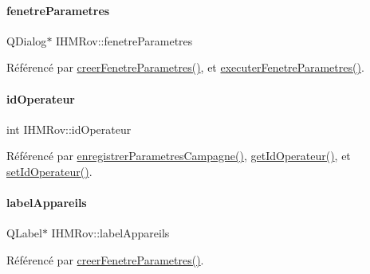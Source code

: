 \paragraph{\texorpdfstring{fenetre\+Parametres}{fenetreParametres}}
{\footnotesize\ttfamily Q\+Dialog$\ast$ I\+H\+M\+Rov\+::fenetre\+Parametres\hspace{0.3cm}{\ttfamily [private]}}



Référencé par \hyperlink{class_i_h_m_rov_aed451139ac09ef18b7c92637761d80ce}{creer\+Fenetre\+Parametres()}, et \hyperlink{class_i_h_m_rov_a2ec97de9b75c073c6a4dd0792a284002}{executer\+Fenetre\+Parametres()}.

\mbox{\label{class_i_h_m_rov_a110af5c174e9fbba12bffbe0301ed690}} 
\paragraph{\texorpdfstring{id\+Operateur}{idOperateur}}
{\footnotesize\ttfamily int I\+H\+M\+Rov\+::id\+Operateur\hspace{0.3cm}{\ttfamily [private]}}



Référencé par \hyperlink{class_i_h_m_rov_a229194814bfb1fc94ab3cc86d6411921}{enregistrer\+Parametres\+Campagne()}, \hyperlink{class_i_h_m_rov_a79cddc1e905195eb11a8960abadf7d2f}{get\+Id\+Operateur()}, et \hyperlink{class_i_h_m_rov_a021be212b27d0c4a08e14695521aacbc}{set\+Id\+Operateur()}.

\mbox{\label{class_i_h_m_rov_ac6f93c34da2a4e24f743e61fd5d62405}} 
\paragraph{\texorpdfstring{label\+Appareils}{labelAppareils}}
{\footnotesize\ttfamily Q\+Label$\ast$ I\+H\+M\+Rov\+::label\+Appareils\hspace{0.3cm}{\ttfamily [private]}}



Référencé par \hyperlink{class_i_h_m_rov_aed451139ac09ef18b7c92637761d80ce}{creer\+Fenetre\+Parametres()}.

